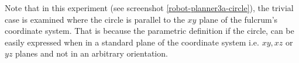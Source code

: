 Note that in this experiment (see screenshot \ref{robot-planner3a-circle}), the trivial case is examined where the circle is parallel to the $xy$ plane of the fulcrum's 
coordinate system. That is because the parametric definition if the circle, can be easily expressed when in a standard plane of the coordinate system i.e. $xy, xz$ 
or $yz$ planes and not in an arbitrary orientation.



